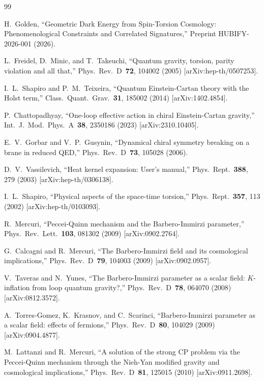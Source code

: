 \documentclass[11pt,letterpaper]{article}
\begin{document}
\begin{thebibliography}{99}

H.~Golden,
``Geometric Dark Energy from Spin-Torsion Cosmology: Phenomenological
Constraints and Correlated Signatures,''
Preprint HUBIFY-2026-001 (2026).

L.~Freidel, D.~Minic, and T.~Takeuchi,
``Quantum gravity, torsion, parity violation and all that,''
Phys.\ Rev.\ D~\textbf{72}, 104002 (2005)
[arXiv:hep-th/0507253].

I.~L.~Shapiro and P.~M.~Teixeira,
``Quantum Einstein-Cartan theory with the Holst term,''
Class.\ Quant.\ Grav.\ \textbf{31}, 185002 (2014)
[arXiv:1402.4854].

P.~Chattopadhyay,
``One-loop effective action in chiral Einstein-Cartan gravity,''
Int.\ J.\ Mod.\ Phys.\ A~\textbf{38}, 2350186 (2023)
[arXiv:2310.10405].

E.~V.~Gorbar and V.~P.~Gusynin,
``Dynamical chiral symmetry breaking on a brane in reduced QED,''
Phys.\ Rev.\ D~\textbf{73}, 105028 (2006).

D.~V.~Vassilevich,
``Heat kernel expansion: User's manual,''
Phys.\ Rept.\ \textbf{388}, 279 (2003)
[arXiv:hep-th/0306138].

I.~L.~Shapiro,
``Physical aspects of the space-time torsion,''
Phys.\ Rept.\ \textbf{357}, 113 (2002)
[arXiv:hep-th/0103093].

R.~Mercuri,
``Peccei-Quinn mechanism and the Barbero-Immirzi parameter,''
Phys.\ Rev.\ Lett.\ \textbf{103}, 081302 (2009)
[arXiv:0902.2764].

G.~Calcagni and R.~Mercuri,
``The Barbero-Immirzi field and its cosmological implications,''
Phys.\ Rev.\ D~\textbf{79}, 104003 (2009)
[arXiv:0902.0957].

V.~Taveras and N.~Yunes,
``The Barbero-Immirzi parameter as a scalar field:
$K$-inflation from loop quantum gravity?,''
Phys.\ Rev.\ D~\textbf{78}, 064070 (2008)
[arXiv:0812.3572].

A.~Torres-Gomez, K.~Krasnov, and C.~Scarinci,
``Barbero-Immirzi parameter as a scalar field: effects of fermions,''
Phys.\ Rev.\ D~\textbf{80}, 104029 (2009)
[arXiv:0904.4877].

M.~Lattanzi and R.~Mercuri,
``A solution of the strong CP problem via the Peccei-Quinn mechanism
through the Nieh-Yan modified gravity and cosmological implications,''
Phys.\ Rev.\ D~\textbf{81}, 125015 (2010)
[arXiv:0911.2698].


\end{thebibliography}
\end{document}
